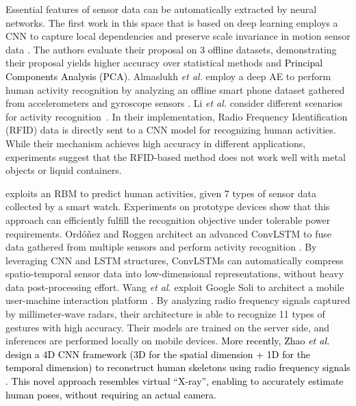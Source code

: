 \documentclass[journal,comsoc,letter]{IEEEtran}
\newcommand{\edit}[1]{\textcolor{black}{#1}}
\begin{document}
Essential features of sensor data can be automatically extracted by neural networks.
The first work in this space that is based on deep learning employs a CNN to capture local dependencies and preserve scale invariance in motion sensor data \cite{zeng2014convolutional}. The authors evaluate their proposal on 3 offline datasets, demonstrating their proposal yields higher accuracy over statistical methods and \edit{Principal Components Analysis (PCA)}. Almaslukh \emph{et al.} employ a deep AE to perform human activity recognition by analyzing an offline smart phone dataset gathered from accelerometers and gyroscope sensors \cite{almaslukh2017effective}. Li \emph{et al.} consider different scenarios for activity recognition~\cite{li2016deep22}. In their implementation, Radio Frequency Identification (RFID) data is directly sent to a CNN model for recognizing human activities. While their mechanism achieves high accuracy in different applications, experiments suggest that the RFID-based method does not work well with metal objects or liquid containers.

\cite{bhattacharya2016smart} exploits an RBM to predict human activities, given 7 types of sensor data collected by a smart watch. Experiments on prototype devices show that this approach can efficiently fulfill the recognition objective under tolerable power requirements. Ord{\'o}{\~n}ez and Roggen architect an advanced ConvLSTM to fuse data gathered from multiple sensors and perform activity recognition \cite{ordonez2016deep}. By leveraging CNN and LSTM structures, ConvLSTMs can automatically compress spatio-temporal sensor data into low-dimensional representations, without heavy data post-processing effort. Wang \emph{et al.} exploit Google Soli to architect a mobile user-machine interaction platform \cite{wang2016interacting}. By analyzing radio frequency signals captured by millimeter-wave radars, their architecture is able to recognize 11 types of gestures with high accuracy. Their models are trained on the server side, and inferences are performed locally on mobile devices. \edit{More recently, Zhao \emph{et al.} design a 4D CNN framework (3D for the spatial dimension + 1D for the temporal dimension) to reconstruct human skeletons using radio frequency signals \cite{zhao2018rf}. This novel approach resembles virtual ``X-ray'', enabling to accurately estimate human poses, without requiring an actual camera.}\\
\end{document}
